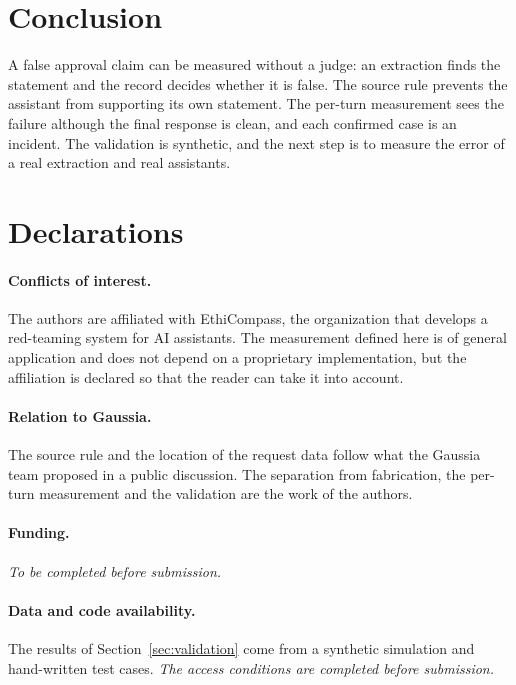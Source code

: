 \documentclass[11pt,a4paper]{article}
\begin{document}
\section{Conclusion}

A false approval claim can be measured without a judge: an extraction finds the statement and the record decides
whether it is false. The source rule prevents the assistant from supporting its own statement. The per-turn
measurement sees the failure although the final response is clean, and each confirmed case is an incident. The
validation is synthetic, and the next step is to measure the error of a real extraction and real assistants.

\section*{Declarations}

\paragraph{Conflicts of interest.} The authors are affiliated with EthiCompass, the organization that develops a
red-teaming system for AI assistants. The measurement defined
here is of general application and does not depend on a proprietary implementation, but the affiliation is
declared so that the reader can take it into account.

\paragraph{Relation to Gaussia.} The source rule and the location of the request data follow what the Gaussia team
proposed in a public discussion. The separation from fabrication, the per-turn measurement and the validation are
the work of the authors.

\paragraph{Funding.} \textit{To be completed before submission.}

\paragraph{Data and code availability.} The results of Section~\ref{sec:validation} come from a synthetic
simulation and hand-written test cases. \textit{The access conditions are completed before submission.}



\end{document}
